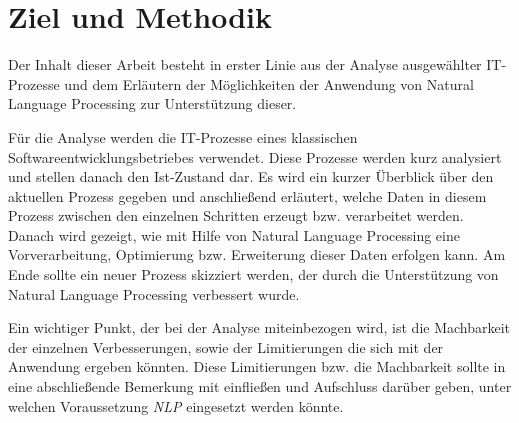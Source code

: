 \section{Ziel und Methodik}
Der Inhalt dieser Arbeit besteht in erster Linie aus der Analyse ausgewählter IT-Prozesse und dem Erläutern der Möglichkeiten der Anwendung von Natural Language Processing zur Unterstützung dieser. 

Für die Analyse werden die IT-Prozesse eines klassischen Softwareentwicklungsbetriebes verwendet. Diese Prozesse werden kurz analysiert und stellen danach den Ist-Zustand dar. Es wird ein kurzer Überblick über den aktuellen Prozess gegeben und anschließend erläutert, welche Daten in diesem Prozess zwischen den einzelnen Schritten erzeugt bzw. verarbeitet werden. Danach wird gezeigt, wie mit Hilfe von Natural Language Processing eine Vorverarbeitung, Optimierung bzw. Erweiterung dieser Daten erfolgen kann. Am Ende sollte ein neuer Prozess skizziert werden, der durch die Unterstützung von Natural Language Processing verbessert wurde. 

Ein wichtiger Punkt, der bei der Analyse miteinbezogen wird, ist die Machbarkeit der einzelnen Verbesserungen, sowie der Limitierungen die sich mit der Anwendung ergeben könnten. Diese Limitierungen bzw. die Machbarkeit sollte in eine abschließende Bemerkung mit einfließen und Aufschluss darüber geben, unter welchen Voraussetzung \textit{NLP} eingesetzt werden könnte.
